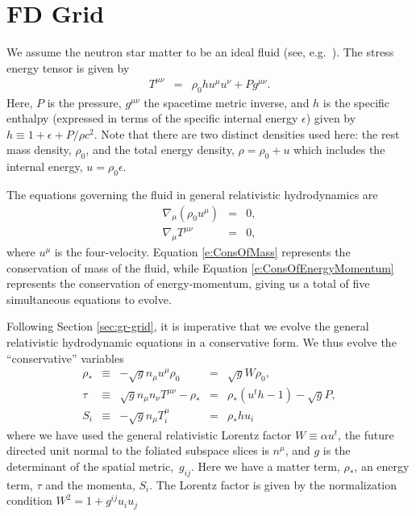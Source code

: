 \section{FD Grid}
\label{sec:fd-grid}

We assume the neutron star matter to be an ideal fluid (see, e.g.~\cite{Duez2005}).  The stress energy tensor is given by
\begin{eqnarray}
T^{\mu \nu} &=& \rho_0 h u^\mu u^\nu + P g^{\mu \nu}.
\label{e:StressEnergyTensor}
\end{eqnarray}
Here, $P$ is the pressure, $g^{\mu \nu}$ the spacetime metric inverse, and $h$ is the specific enthalpy (expressed in terms of the specific internal energy $\epsilon$) given by $h \equiv 1 + \epsilon + P/{\rho c^2}$.
Note that there are two distinct densities used here: the rest mass density, $\rho_0$, and the total energy density, $\rho = \rho_0 + u$ which includes the internal energy, $u = \rho_0 \epsilon$.

The equations governing the fluid in general relativistic hydrodynamics are
\begin{eqnarray}
\nabla_\mu \left( \rho_0 u^\mu \right) &=& 0, \label{e:ConsOfMass} \\
\nabla_\mu T^{\mu \nu} &=& 0, \label{e:ConsOfEnergyMomentum}
\end{eqnarray}
where $u^\mu$ is the four-velocity.  Equation \ref{e:ConsOfMass} represents the conservation of mass of the fluid, while Equation \ref{e:ConsOfEnergyMomentum} represents the conservation of energy-momentum, giving us a total of five simultaneous equations to evolve. 

Following Section \ref{sec:gr-grid}, it is imperative that we evolve the general relativistic hydrodynamic equations in a conservative form.  We thus evolve the ``conservative'' variables
\begin{align}
\label{e:RhoStar}
\rho_*	&\equiv& -\sqrt{g} n_\mu u^\mu \rho_0 
		&=& \sqrt{g} W \rho_0, \\
\label{e:Tau}
\tau 	&\equiv& \sqrt{g} n_\mu n_\nu T^{\mu\nu} - \rho_* 
		&=& \rho_* \left(u^t h - 1\right) - \sqrt{g} P, \\
\label{e:Sflux}
S_i  	&\equiv& -\sqrt{g} n_\mu T^\mu_i 
		&=& \rho_* h u_i
\end{align}
where we have used the general relativistic Lorentz factor $W \equiv \alpha u^t$, the future directed unit normal to the foliated subspace slices is $n^\mu$, and $g$ is the determinant of the spatial \mbox{metric, $g_{ij}$}.  Here we have a matter term, $\rho_*$, an energy term, $\tau$ and the momenta, $S_i$.  The Lorentz factor is given by the normalization condition $W^2 = 1 + g^{ij} u_i u_j$

